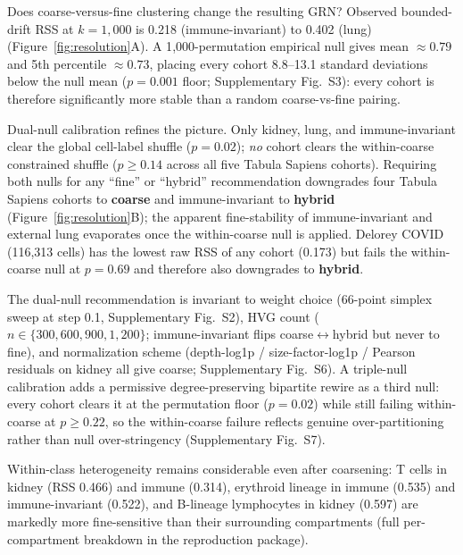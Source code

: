 \documentclass[12pt]{article}
\begin{document}
Does coarse-versus-fine clustering change the resulting GRN? Observed
bounded-drift RSS at $k = 1{,}000$ is 0.218 (immune-invariant) to
0.402 (lung) (Figure~\ref{fig:resolution}A). A 1{,}000-permutation
empirical null gives mean $\approx 0.79$ and 5th percentile $\approx 0.73$,
placing every cohort 8.8--13.1 standard deviations below the null mean
($p = 0.001$ floor; Supplementary Fig.~S3): every cohort is therefore
significantly more stable than a random coarse-vs-fine pairing.

Dual-null calibration refines the picture. Only kidney, lung, and
immune-invariant clear the global cell-label shuffle ($p = 0.02$);
\emph{no} cohort clears the within-coarse constrained shuffle
($p \geq 0.14$ across all five Tabula Sapiens cohorts). Requiring both
nulls for any ``fine'' or ``hybrid'' recommendation downgrades four
Tabula Sapiens cohorts to \textbf{coarse} and immune-invariant to
\textbf{hybrid} (Figure~\ref{fig:resolution}B); the apparent
fine-stability of immune-invariant and external lung evaporates once
the within-coarse null is applied. Delorey COVID (116{,}313 cells)
has the lowest raw RSS of any cohort (0.173) but fails the
within-coarse null at $p = 0.69$ and therefore also downgrades to
\textbf{hybrid}.

The dual-null recommendation is invariant to weight choice
(66-point simplex sweep at step 0.1, Supplementary Fig.~S2),
HVG count ($n \in \{300, 600, 900, 1{,}200\}$; immune-invariant
flips coarse$\leftrightarrow$hybrid but never to fine), and
normalization scheme (depth-log1p / size-factor-log1p / Pearson
residuals on kidney all give coarse; Supplementary Fig.~S6). A
triple-null calibration adds a permissive degree-preserving bipartite
rewire as a third null: every cohort clears it at the permutation
floor ($p = 0.02$) while still failing within-coarse at $p \geq 0.22$,
so the within-coarse failure reflects genuine over-partitioning rather
than null over-stringency (Supplementary Fig.~S7).

Within-class heterogeneity remains considerable even after coarsening:
T cells in kidney (RSS 0.466) and immune (0.314), erythroid lineage
in immune (0.535) and immune-invariant (0.522), and B-lineage
lymphocytes in kidney (0.597) are markedly more fine-sensitive than
their surrounding compartments (full per-compartment breakdown in the
reproduction package).
\end{document}
